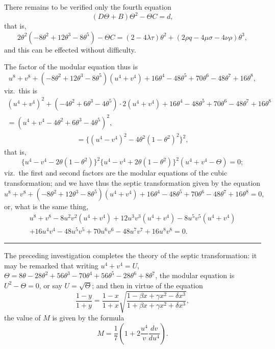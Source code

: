 \documentclass[12pt,a4paper]{article}
\begin{document}
There remains to be verified only the fourth equation
\[
(D\Theta + B)\Theta^2 - \Theta C = d,
\]
that is,
\[
2\theta^2(-8\theta^2 + 12\theta^3 - 8\theta^5) - \Theta C = (2 - 4\lambda\tau)\theta^2 + (2\rho q - 4\mu\sigma - 4\nu\rho)\theta^3,
\]
and this can be effected without difficulty.

The factor of the modular equation thus is
\[
u^8 + v^8 + (-8\theta^2 + 12\theta^3 - 8\theta^5)(u^4 + v^4) + 16\theta^4 - 48\theta^5 + 70\theta^6 - 48\theta^7 + 16\theta^8,
\]
viz.\ this is
\begin{multline*}
(u^4 + v^4)^2 + (-4\theta^2 + 6\theta^3 - 4\theta^5) \cdot 2(u^4 + v^4) + 16\theta^4 - 48\theta^5 + 70\theta^6 - 48\theta^7 + 16\theta^8\\
= (u^4 + v^4 - 4\theta^2 + 6\theta^3 - 4\theta^5)^2,
\end{multline*}
\begin{multline*}
= \{(u^4 - v^4)^2 - 4\theta^2(1 - \theta^2)^2\}^2,\end{multline*}
that is,
\[
\{u^4 - v^4 - 2\theta(1 - \theta^2)\}^2 \{u^4 - v^4 + 2\theta(1 - \theta^2)\}^2 (u^4 + v^4 - \Theta) = 0;
\]
viz.\ the first and second factors are the modular equations of the cubic transformation; and we have thus the septic transformation given by the equation
\[
u^8 + v^8 + (-8\theta^2 + 12\theta^3 - 8\theta^5)(u^4 + v^4) + 16\theta^4 - 48\theta^5 + 70\theta^6 - 48\theta^7 + 16\theta^8 = 0,
\]
or, what is the same thing,
\begin{multline*}
u^8 + v^8 - 8u^2 v^2(u^4 + v^4) + 12u^3 v^3(u^4 + v^4) - 8u^5 v^5(u^4 + v^4)\\
+ 16u^4 v^4 - 48u^5 v^5 + 70u^6 v^6 - 48u^7 v^7 + 16u^8 v^8 = 0.
\end{multline*}

\medskip
\noindent\rule{\textwidth}{0.4pt}

The preceding investigation completes the theory of the septic transformation: it may be remarked that writing $u^4 + v^4 = U$, $\Theta = 8\theta - 28\theta^2 + 56\theta^3 - 70\theta^4 + 56\theta^5 - 28\theta^6 + 8\theta^7$, the modular equation is $U^2 - \Theta = 0$, or say $U = \surd\Theta$; and then in virtue of the equation
\[
\frac{1 - y}{1 + y} = \frac{1 - x}{1 + x}\sqrt{\frac{1 - \beta x + \gamma x^2 - \delta x^3}{1 + \beta x + \gamma x^2 + \delta x^3}},
\]
the value of $M$ is given by the formula
\[
M = \frac{1}{7}\left(1 + 2\frac{u^4}{v}\frac{dv}{du^4}\right).
\]



\newpage
\end{document}
